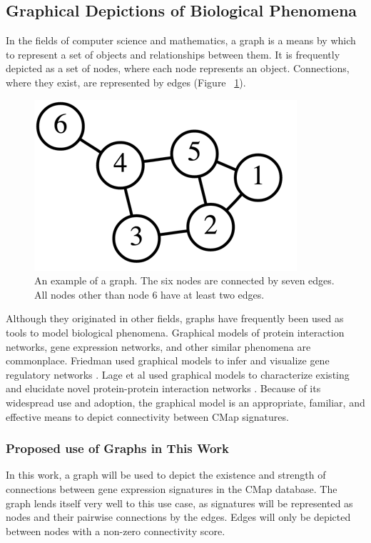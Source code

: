\documentclass[12pt]{article}
\begin{document}
\subsection{Graphical Depictions of Biological Phenomena}

In the fields of computer science and mathematics, a graph is a means by which to represent a set of objects and relationships between them. It is frequently depicted as a set of nodes, where each node represents an object. Connections, where they exist, are represented by edges (Figure ~\ref{fig:graph}).

\begin{figure}[h]
\centering
\includegraphics[scale=0.5]{img/graph_example}
\caption{An example of a graph. The six nodes are connected by seven edges. All nodes other than node 6 have at least two edges.}
\label{fig:graph}
\end{figure} 

Although they originated in other fields, graphs have frequently been used as tools to model biological phenomena. Graphical models of protein interaction networks, gene expression networks, and other similar phenomena are commonplace. Friedman used graphical models to infer and visualize gene regulatory networks \cite{friedman_inferring_2004}. Lage et al used graphical models to characterize existing and elucidate novel protein-protein interaction networks \cite{lage_human_2007}. Because of its widespread use and adoption, the graphical model is an appropriate, familiar, and effective means to depict connectivity between CMap signatures.

\subsubsection{Proposed use of Graphs in This Work}

In this work, a graph will be used to depict the existence and strength of connections between gene expression signatures in the CMap database. The graph lends itself very well to this use case, as signatures will be represented as nodes and their pairwise connections by the edges. Edges will only be depicted between nodes with a non-zero connectivity score. 
\end{document}
